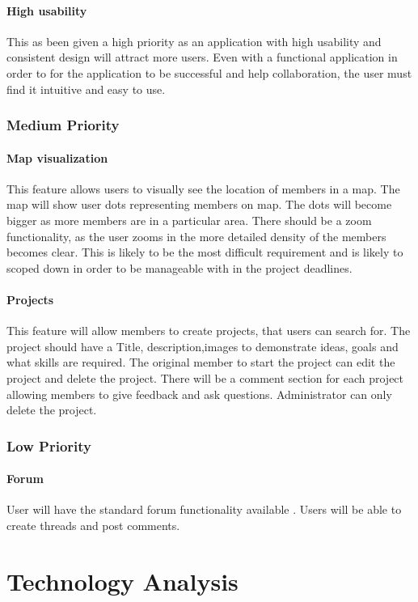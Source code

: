\documentclass[a4paper,oneside,11pt]{report}
\begin{document}
\subsubsection{High usability} 
This as been given a high priority as an application with high usability and consistent design will attract more users. Even with a functional application in order to for the application to be successful and help collaboration, the user must find it intuitive and easy to use.
\subsection{Medium Priority}
\subsubsection{Map visualization}
This feature allows users to visually see the location of members in a map. The map will show user dots representing members on map. The dots will become bigger as more members are in a particular area. There should be a zoom functionality, as the user zooms in the more detailed density of the members becomes clear. This is likely to be the most difficult requirement and is likely to scoped down in order to be manageable with in the project deadlines.
\subsubsection{Projects}
This feature will allow members to create projects, that users can search for. The project should have a Title, description,images to demonstrate ideas, goals and what skills are required. The original member to start the project can edit the project and delete the project. There will be a comment section for each project allowing members to give feedback and ask questions. Administrator can only delete the project.
\subsection{Low Priority}
\subsubsection{Forum}
User will have the standard forum functionality available . Users will be able to create threads and post comments. 

\chapter{Technology Analysis}
\end{document}
